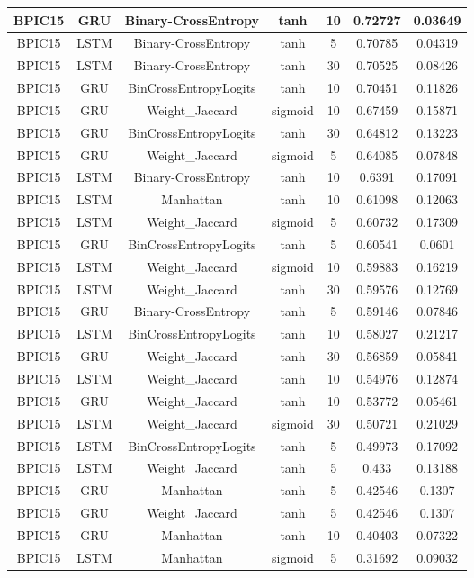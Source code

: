 \documentclass{article}%
\begin{document}
\begin{longtable}{|c|c|c|c|c|c|c|}
\hline%
BPIC15&GRU&Binary{-}CrossEntropy&tanh&10&0.72727&0.03649\\%
\hline%
BPIC15&LSTM&Binary{-}CrossEntropy&tanh&5&0.70785&0.04319\\%
\hline%
BPIC15&LSTM&Binary{-}CrossEntropy&tanh&30&0.70525&0.08426\\%
\hline%
BPIC15&GRU&BinCrossEntropyLogits&tanh&10&0.70451&0.11826\\%
\hline%
BPIC15&GRU&Weight\_Jaccard&sigmoid&10&0.67459&0.15871\\%
\hline%
BPIC15&GRU&BinCrossEntropyLogits&tanh&30&0.64812&0.13223\\%
\hline%
BPIC15&GRU&Weight\_Jaccard&sigmoid&5&0.64085&0.07848\\%
\hline%
BPIC15&LSTM&Binary{-}CrossEntropy&tanh&10&0.6391&0.17091\\%
\hline%
BPIC15&LSTM&Manhattan&tanh&10&0.61098&0.12063\\%
\hline%
BPIC15&LSTM&Weight\_Jaccard&sigmoid&5&0.60732&0.17309\\%
\hline%
BPIC15&GRU&BinCrossEntropyLogits&tanh&5&0.60541&0.0601\\%
\hline%
BPIC15&LSTM&Weight\_Jaccard&sigmoid&10&0.59883&0.16219\\%
\hline%
BPIC15&LSTM&Weight\_Jaccard&tanh&30&0.59576&0.12769\\%
\hline%
BPIC15&GRU&Binary{-}CrossEntropy&tanh&5&0.59146&0.07846\\%
\hline%
BPIC15&LSTM&BinCrossEntropyLogits&tanh&10&0.58027&0.21217\\%
\hline%
BPIC15&GRU&Weight\_Jaccard&tanh&30&0.56859&0.05841\\%
\hline%
BPIC15&LSTM&Weight\_Jaccard&tanh&10&0.54976&0.12874\\%
\hline%
BPIC15&GRU&Weight\_Jaccard&tanh&10&0.53772&0.05461\\%
\hline%
BPIC15&LSTM&Weight\_Jaccard&sigmoid&30&0.50721&0.21029\\%
\hline%
BPIC15&LSTM&BinCrossEntropyLogits&tanh&5&0.49973&0.17092\\%
\hline%
BPIC15&LSTM&Weight\_Jaccard&tanh&5&0.433&0.13188\\%
\hline%
BPIC15&GRU&Manhattan&tanh&5&0.42546&0.1307\\%
\hline%
BPIC15&GRU&Weight\_Jaccard&tanh&5&0.42546&0.1307\\%
\hline%
BPIC15&GRU&Manhattan&tanh&10&0.40403&0.07322\\%
\hline%
BPIC15&LSTM&Manhattan&sigmoid&5&0.31692&0.09032\\%

\end{longtable}
\end{document}
